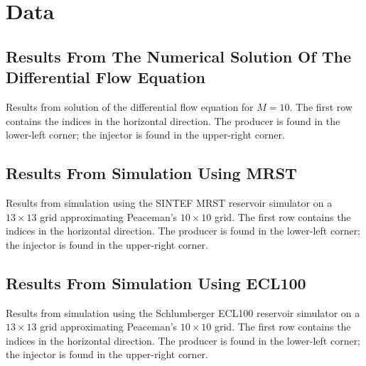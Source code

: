 
\section{Data} %
\label{sec:data}
\subsection{Results From The Numerical Solution Of The Differential Flow Equation} %
\label{sub:results_from_numerical_solution_of_the_differential_flow_equation}
Results from solution of the differential flow equation for $M=10$. The first row contains the indices in the horizontal direction. The producer is found in the lower-left corner; the injector is found in the upper-right corner.

{\tiny
\vspace{.5cm}
\hspace{-1cm}
}

\subsection{Results From Simulation Using MRST} %
\label{sub:results_from_simulation_using_mrst}
Results from simulation using the SINTEF MRST reservoir simulator on a $13\times 13$ grid approximating Peaceman's $10\times 10$ grid. The first row contains the indices in the horizontal direction. The producer is found in the lower-left corner; the injector is found in the upper-right corner.

{\tiny
\vspace{.5cm}
\hspace{-1cm}
}

\subsection{Results From Simulation Using ECL100} %
\label{sub:results_from_simulation_using_ecl100_metric}
Results from simulation using the Schlumberger ECL100 reservoir simulator on a $13\times 13$ grid approximating Peaceman's $10\times 10$ grid. The first row contains the indices in the horizontal direction. The producer is found in the lower-left corner; the injector is found in the upper-right corner.

{\tiny
\vspace{.5cm}
\noindent
{}}

